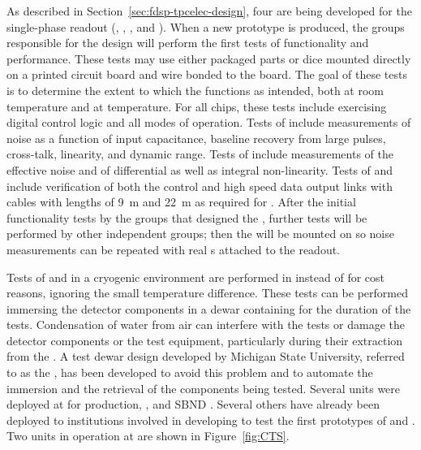 As described in Section~\ref{sec:fdsp-tpcelec-design}, four  
are being developed for the   single-phase  readout 
(, , , and ). 
When a new prototype  is produced, the groups responsible for the  design will perform the first tests of 
 functionality and performance. These tests may use either 
packaged parts or dice mounted directly on a printed circuit board 
and wire bonded to the board.  The goal of these tests is to determine 
the extent to which the  functions as intended, both at room 
temperature and at \lntwo temperature.  For all chips, these tests 
include exercising digital control logic and all modes of operation. Tests 
of   include measurements of noise as a function 
of input capacitance, baseline recovery from large pulses, cross-talk, linearity, 
and dynamic range. Tests of  include measurements of the effective noise and 
of differential as well as integral non-linearity. Tests of  and  
include verification of both the control and high speed data output links with 
cables with lengths of \SI{9}{m} and \SI{22}{m} as required for  .
After the initial functionality
tests by the groups that designed the , further
tests will be performed by other independent groups; then the 
will be mounted on  so noise measurements can be repeated
with real s attached to the readout.

Tests of  and  in a cryogenic environment
are performed in \lntwo instead of  for cost reasons, ignoring
the small temperature difference. These tests can be performed immersing
the detector components in a dewar containing \lntwo for the duration
of the tests. Condensation of water from air can interfere with
the tests or damage the detector components or the test equipment,
particularly during their extraction from the \lntwo. A test dewar
design developed by Michigan State University, referred to as the
, has been developed to avoid
this problem and to automate the immersion and the retrieval of 
the components being tested. Several  units
were deployed at  for  production,  , and SBND  .
Several others have already been deployed to institutions involved in
developing  to test the first prototypes of 
and . Two  units in operation at  are 
shown in Figure~\ref{fig:CTS}.

